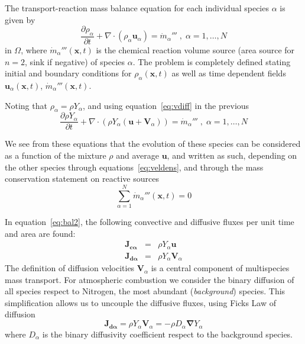 The transport-reaction mass balance equation for each individual species $\alpha$ is given by
%
\begin{equation}
   \frac{\partial \rho_\alpha}{ \partial t} + \nabla \cdot (\rho_\alpha  \mathbf{u}_\alpha) = \dot{m}_\alpha''' \; , \; \alpha=1,\dots,N \label{eq:bal}
\end{equation}
%
in $\Omega$, where $\dot{m}_\alpha'''(\mathbf{x},t)$ is the chemical reaction volume source (area source for $n=2$, sink if negative) of species $\alpha$. The problem is completely defined stating initial and boundary conditions for $\rho_\alpha(\mathbf{x},t)$ as well as time dependent fields $\mathbf{u}_\alpha(\mathbf{x},t)$, $\dot{m}_\alpha'''(\mathbf{x},t)$.

Noting that $ \rho_\alpha = \rho Y_\alpha$, and using equation~\eqref{eq:vdiff} in the previous
%
\begin{equation}
   \frac{\partial \rho Y_\alpha}{ \partial t} + \nabla \cdot \left( \rho Y_\alpha  (\mathbf{u}+\mathbf{V}_\alpha) \right) = \dot{m}_\alpha''' \; , \; \alpha=1,\dots,N \label{eq:bal2}
\end{equation}
%

We see from these equations that the evolution of these species can be considered as a function of the mixture $\rho$ and average $\mathbf{u}$, and written as such, depending on the other species through equations~\eqref{eq:veldens}, and through the mass conservation statement on reactive sources
%
\begin{equation}
  \sum\limits_{\alpha=1}^{N} \dot{m}_\alpha'''(\mathbf{x},t) = 0
\end{equation}
%

In equation~\eqref{eq:bal2}, the following convective and diffusive fluxes per unit time and area are found:
%
\begin{eqnarray}
  \mathbf{J_{c \alpha}} &=& \rho Y_\alpha  \mathbf{u} \label{eq:jc} \\
  \mathbf{J_{d \alpha}} &=& \rho Y_\alpha  \mathbf{V}_\alpha \label{eq:jd}
\end{eqnarray}
%
The definition of diffusion velocities $\mathbf{V}_\alpha$ is a central component of multispecies mass transport. For atmospheric combustion we consider the binary diffusion of all species respect to Nitrogen, the most abundant (\textit{background}) species. This simplification allows us to uncouple the diffusive fluxes, using Ficks Law of diffusion
%
\begin{equation}
   \mathbf{J_{d \alpha}} = \rho Y_\alpha  \mathbf{V}_\alpha = - \rho D_\alpha \boldsymbol{\nabla} Y_\alpha
\end{equation}
%
where $D_\alpha$ is the binary diffusivity coefficient respect to the background species.

